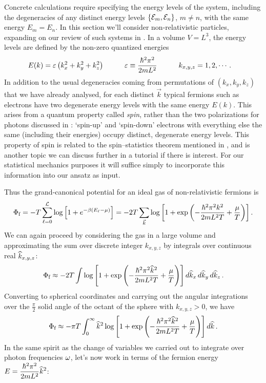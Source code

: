 Concrete calculations require specifying the energy levels of the system, including the degeneracies of any distinct energy levels $\left\{\mathcal E_m, \mathcal E_n\right\}$, $m \neq n$, with the same energy $E_m = E_n$.
In this section we'll consider non-relativistic particles, expanding on our review of such systems in .
In a volume $V = L^3$, the energy levels are defined by the non-zero quantized energies
\begin{align*}
  E(k) & = \varepsilon \left(k_x^2 + k_y^2 + k_z^2\right) \qquad &
  \varepsilon & \equiv \frac{\hbar^2 \pi^2}{2mL^2} \qquad &
  k_{x, y, z} & = 1, 2, \cdots.
\end{align*}
In addition to the usual degeneracies coming from permutations of $(k_x, k_y, k_z)$ that we have already analysed, for each distinct $\vec k$ typical fermions such as electrons have two degenerate energy levels with the same energy $E(k)$.
This arises from a quantum property called \textit{spin}, rather than the two polarizations for photons discussed in : `spin-up' and `spin-down' electrons with everything else the same (including their energies) occupy distinct, degenerate energy levels.
This property of spin is related to the spin--statistics theorem mentioned in , and is another topic we can discuss further in a tutorial if there is interest.
For our statistical mechanics purposes it will suffice simply to incorporate this information into our ansatz as input.

Thus the grand-canonical potential for an ideal gas of non-relativistic fermions is
\begin{equation*}
  \Phi_{\text{f}} = -T \sum_{\ell = 0}^{\mathcal L} \log\left[1 + e^{-\beta (E_{\ell} - \mu)}\right] = -2T \sum_{\vec k} \log\left[1 + \exp\left(-\frac{\hbar^2 \pi^2 k^2}{2mL^2 T} + \frac{\mu}{T}\right)\right].
\end{equation*}
We can again proceed by considering the gas in a large volume and approximating the sum over discrete integer $k_{x, y, z}$ by integrals over continuous real $\widehat k_{x, y, z}$:
\begin{equation*}
  \Phi_{\text{f}} \approx -2T \int \log\left[1 + \exp\left(-\frac{\hbar^2 \pi^2 \widehat k^2}{2mL^2 T} + \frac{\mu}{T}\right)\right] \mathop{d\widehat k_x} \mathop{d\widehat k_y} \mathop{d\widehat k_z}.
\end{equation*}
Converting to spherical coordinates and carrying out the angular integrations over the $\frac{\pi}{2}$ solid angle of the octant of the sphere with $k_{x, y, z} > 0$, we have
\begin{equation*}
  \Phi_{\text{f}} \approx -\pi T \int_0^{\infty} \widehat k^2 \log\left[1 + \exp\left(-\frac{\hbar^2 \pi^2 \widehat k^2}{2mL^2 T} + \frac{\mu}{T}\right)\right] \mathop{d\widehat k}.
\end{equation*}
In the same spirit as the change of variables we carried out to integrate over photon frequencies $\omega$, let's now work in terms of the fermion energy $E = \displaystyle \frac{\hbar^2 \pi^2}{2mL^2}\widehat k^2$:
\begin{mdframed}
  \ \\[100 pt]
\end{mdframed}

